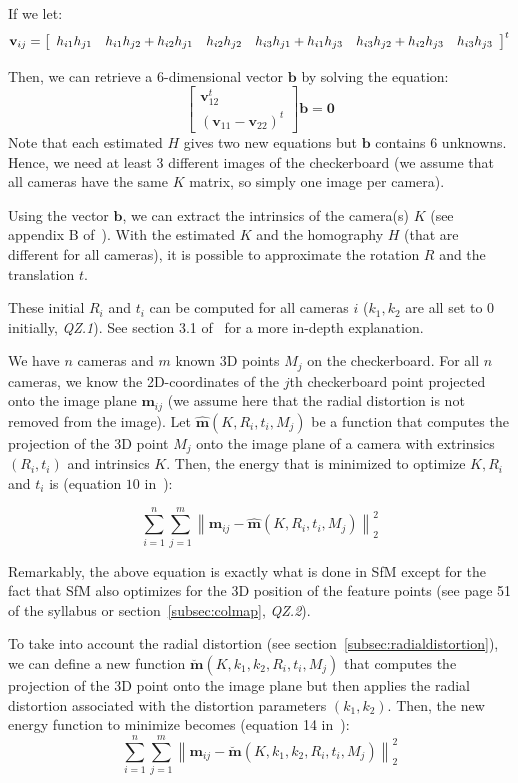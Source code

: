 If we let:
\[\textbf{v}_{ij}=\left[\begin{array}{c c c c c c}
         h_{i1} h_{j1} & h_{i1}h_{j2}+h_{i2}h_{j1} & h_{i2}h_{j2} & h_{i3}h_{j1}+h_{i1}h_{j3} & h_{i3}h_{j2}+h_{i2}h_{j3}
                            & h_{i3}h_{j3}
\end{array}\right]^t\]

Then, we can retrieve a 6-dimensional vector $\textbf{b}$ by solving the equation:
\[\left[\begin{array}{c}
            \textbf{v}^t_{12}\\
            (\textbf{v}_{11}-\textbf{v}_{22})^t
\end{array}\right]\textbf{b}=\textbf{0}\]
Note that each estimated $H$ gives two new equations but $\textbf{b}$ contains 6 unknowns.
Hence, we need at least 3 different images of the checkerboard (we assume that all cameras have the same $K$ matrix, so
simply one image per camera).

Using the vector $\textbf{b}$, we can extract the intrinsics of the camera(s) $K$ (see appendix B of~\citep{zhang}).
With the estimated $K$ and the homography $H$ (that are different for all cameras), it is possible to approximate the
rotation $R$ and the translation $t$.

These initial $R_i$ and $t_i$ can be computed for all cameras $i$ ($k_1,k_2$ are all set to 0 initially, \textit{QZ.1}).
See section 3.1 of~\citep{zhang} for a more in-depth explanation.

We have $n$ cameras and $m$ known 3D points $\textit{M}_j$ on the checkerboard.
For all $n$ cameras, we know the 2D-coordinates of the $j$th checkerboard point projected onto the image plane
$\textbf{m}_{ij}$ (we assume here that the radial distortion is not removed from the image).
Let $\hat{\textbf{m}}(K,R_i,t_i,\textit{M}_j)$ be a function that computes the projection of the 3D point $\textit{M}_j$
onto the image plane of a camera with extrinsics $(R_i,t_i)$ and intrinsics $K$.
Then, the energy that is minimized to optimize $K,R_i$ and $t_i$ is (equation $10$ in~\citep{zhang}):

\[\sum_{i=1}^{n} \sum_{j=1}^{m} \left\|\textbf{m}_{ij}-\hat{\textbf{m}}(K,R_i,t_i,\textit{M}_j)\right\|_2^2\]

Remarkably, the above equation is exactly what is done in SfM except for the fact that SfM also optimizes for the 3D
position of the feature points (see page 51 of the syllabus or section~\ref{subsec:colmap}, \textit{QZ.2}).

To take into account the radial distortion (see section~\ref{subsec:radialdistortion}), we can define a new function
$\breve{\textbf{m}}(K,k_1,k_2,R_i,t_i,\textit{M}_j)$ that computes the projection of the 3D point onto the image plane but
then applies the radial distortion associated with the distortion parameters $(k_1,k_2)$.
Then, the new energy function to minimize becomes (equation 14 in~\citep{zhang}):
\[\sum_{i=1}^{n} \sum_{j=1}^{m} \left\|\textbf{m}_{ij}-\breve{\textbf{m}}(K,k_1,k_2,R_i,t_i,\textit{M}_j)\right\|_2^2\]

